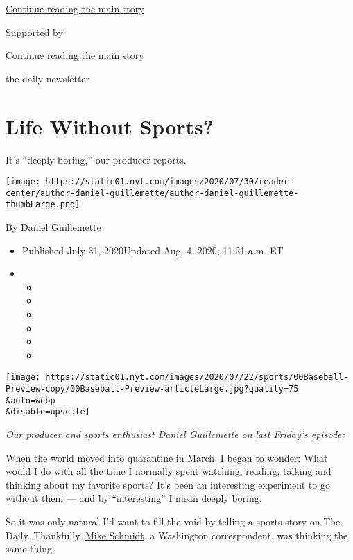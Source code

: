 \protect\hyperlink{after-top}{Continue reading the main story}

Supported by

\protect\hyperlink{after-sponsor}{Continue reading the main story}

the daily newsletter

\hypertarget{life-without-sports}{%
\section{Life Without Sports?}\label{life-without-sports}}

It's ``deeply boring,'' our producer reports.

\texttt{[image: https://static01.nyt.com/images/2020/07/30/reader-center/author-daniel-guillemette/author-daniel-guillemette-thumbLarge.png]}

By Daniel Guillemette

\begin{itemize}
\item
  Published July 31, 2020Updated Aug. 4, 2020, 11:21 a.m. ET
\item
  \begin{itemize}
  \item
  \item
  \item
  \item
  \item
  \item
  \end{itemize}
\end{itemize}

\texttt{[image: https://static01.nyt.com/images/2020/07/22/sports/00Baseball-Preview-copy/00Baseball-Preview-articleLarge.jpg?quality=75\\\&auto=webp\\\&disable=upscale]}

\emph{Our producer and sports enthusiast Daniel Guillemette on}
\href{https://www.nytimes.com/2020/07/24/podcasts/the-daily/mlb-baseball-season-coronavirus.html}{\emph{last
Friday's episode}}\emph{:}

When the world moved into quarantine in March, I began to wonder: What
would I do with all the time I normally spent watching, reading, talking
and thinking about my favorite sports? It's been an interesting
experiment to go without them --- and by ``interesting'' I mean deeply
boring.

So it was only natural I'd want to fill the void by telling a sports
story on The Daily. Thankfully,
\href{https://www.nytimes.com/by/michael-s-schmidt}{Mike Schmidt}, a
Washington correspondent, was thinking the same thing.

